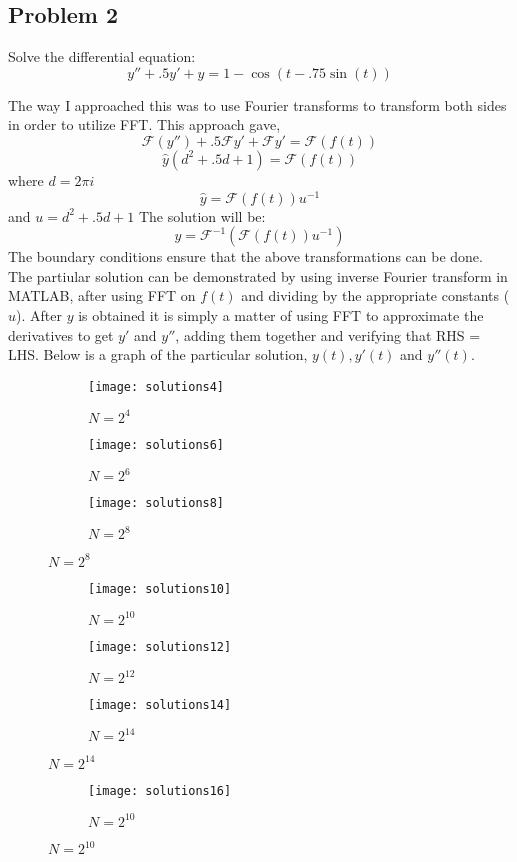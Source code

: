 \documentclass[]{article}
\begin{document}
\begin{flushleft}
\section*{Problem 2}
Solve the differential equation:
\[ y'' + .5y' + y = 1 - \cos(t - .75 \sin(t)) \]

The way I approached this was to use Fourier transforms to transform both sides in order to utilize FFT. This approach gave, 
\[ \mathcal{F}(y'') + .5 \mathcal{F} y' + \mathcal{F}y' = \mathcal{F}(f(t)) \]
\[  \hat{y} (d^2 + .5 d + 1) = \mathcal{F}(f(t)) \]
where $ d = 2\pi i $
\[ \hat{y} = \mathcal{F}(f(t)) u^{-1} \] and $ u = d^2 + .5 d + 1 $ 
The solution will be:
\[ y = \mathcal{F}^{-1}(\mathcal{F}(f(t)) u^{-1}) \]
The boundary conditions ensure that the above transformations can be done. \\
The partiular solution can be demonstrated by using inverse Fourier transform in MATLAB, after using FFT on $ f(t) $ and dividing by the appropriate constants ($ u $). After $ y $ is obtained it is simply a matter of using FFT to approximate the derivatives to get $ y' $ and $ y'' $, adding them together and verifying that RHS = LHS. Below is a graph of the particular solution, $ y(t), y'(t) $ and $ y''(t) $. 

\begin{figure}[H]
	\centering
	    \begin{subfigure}[b]{0.3\textwidth}
	    	\texttt{[image: solutions4]}
	    	\caption{$ N= 2^4 $}
	    \end{subfigure}
	    	    \begin{subfigure}[b]{0.3\textwidth}
	    	    	\texttt{[image: solutions6]}
	    	    	\caption{$ N= 2^6 $}
	    	    \end{subfigure}
	    	    	    \begin{subfigure}[b]{0.3\textwidth}
	    	    	    	\texttt{[image: solutions8]}
	    	    	    	\caption{$ N= 2^8 $}
	    	    	    \end{subfigure}
\end{figure}
\begin{figure}[H]
	\centering
	\begin{subfigure}[b]{0.3\textwidth}
		\texttt{[image: solutions10]}
		\caption{$ N= 2^{10} $}
	\end{subfigure}
	\begin{subfigure}[b]{0.3\textwidth}
 		\texttt{[image: solutions12]}
		\caption{$ N= 2^{12} $}
	\end{subfigure}
	\begin{subfigure}[b]{0.3\textwidth}
		\texttt{[image: solutions14]}
		\caption{$ N= 2^{14} $}
	\end{subfigure}
\end{figure}
\begin{figure}[H]
	\centering
	\begin{subfigure}[b]{0.3\textwidth}
		\texttt{[image: solutions16]}
		\caption{$ N= 2^{10} $}
	\end{subfigure}
\end{figure}


\end{flushleft}
\end{document}
